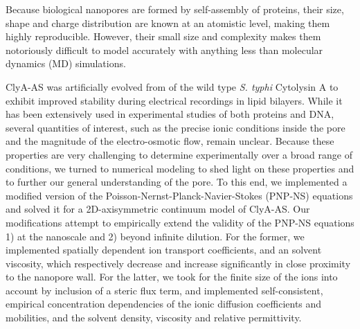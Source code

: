 \documentclass[journal=ancac3,manuscript=article,etalmode=truncate,maxauthors=0,layout=twocolumn]{achemso}
\begin{document}
Because biological nanopores are formed by self-assembly of proteins, their size, shape and charge
distribution are known at an atomistic level, making them highly reproducible. However, their small size and
complexity makes them notoriously difficult to model accurately with anything less than molecular dynamics
(MD) simulations.





ClyA-AS was artificially evolved from of the wild type \textit{S. typhi} Cytolysin A to exhibit improved
stability during electrical recordings in lipid bilayers.\cite{Soskine-2013} While it has been extensively
used in experimental studies of both proteins\cite{Soskine-2013,VanMeervelt-2014,Soskine-Biesemans-2015,
Biesemans-Soskine-2015,Wloka-2017,VanMeervelt-2017} and DNA,\cite{Franceschini-2013,Franceschini-2016}
several quantities of interest, such as the precise ionic conditions inside the pore and the magnitude of the
electro-osmotic flow, remain unclear. Because these properties are very challenging to determine
experimentally over a broad range of conditions, we turned to numerical modeling to shed light on these
properties and to further our general understanding of the pore.
To this end, we implemented a modified version of the Poisson-Nernst-Planck-Navier-Stokes (PNP-NS) equations
and solved it for a 2D-axisymmetric continuum model of ClyA-AS. Our modifications attempt to empirically
extend the validity of the PNP-NS equations 1) at the nanoscale and 2) beyond infinite dilution. For the
former, we  implemented spatially dependent ion transport coefficients,\cite{Makarov-1998, Simakov-2010} and
an solvent viscosity\cite{Pronk-2014,Hsu-2017}, which respectively decrease and increase significantly in
close proximity to the nanopore wall. For the latter, we took for the finite size of the ions into account by
inclusion of a steric flux term,\cite{Lu-2011} and implemented self-consistent, empirical concentration
dependencies of the ionic diffusion coefficients and mobilities,\cite{Baldessari-2008-1} and the solvent
density,\cite{} viscosity and relative permittivity.\cite{Gavish-2016}
\end{document}
